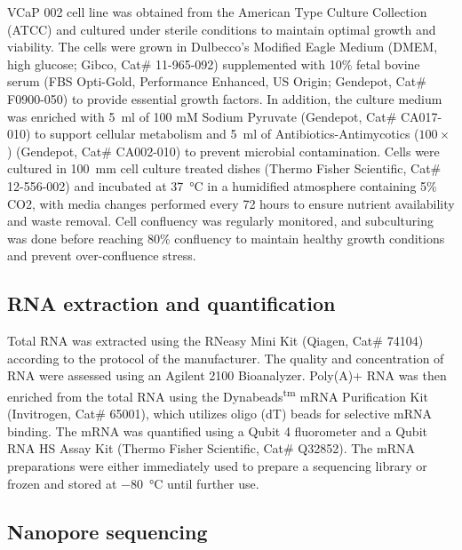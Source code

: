 \documentclass[pdflatex, sn-mathphys-num, lineno]{sn-jnl}%
\theoremstyle{thmstyleone}%
\theoremstyle{thmstyletwo}%
\theoremstyle{thmstylethree}%
\begin{document}
VCaP 002 cell line was obtained from the American Type Culture Collection (ATCC) and cultured under sterile conditions to maintain optimal growth and viability.
The cells were grown in Dulbecco's Modified Eagle Medium (DMEM, high glucose; Gibco, Cat\# 11-965-092) supplemented with 10\% fetal bovine serum (FBS Opti-Gold, Performance Enhanced, US Origin; Gendepot, Cat\# F0900-050) to provide essential growth factors.
In addition, the culture medium was enriched with \SI{5}{\ml} of 100 mM Sodium Pyruvate (Gendepot, Cat\# CA017-010) to support cellular metabolism and \SI{5}{\ml} of Antibiotics-Antimycotics (\( 100\times \)) (Gendepot, Cat\# CA002-010) to prevent microbial contamination.
Cells were cultured in \SI{100}{\mm} cell culture treated dishes (Thermo Fisher Scientific, Cat\# 12-556-002) and incubated at \SI{37}{\degreeCelsius} in a humidified atmosphere containing 5\% CO2, with media changes performed every 72 hours to ensure nutrient availability and waste removal.
Cell confluency was regularly monitored, and subculturing was done before reaching 80\% confluency to maintain healthy growth conditions and prevent over-confluence stress.

\subsection{RNA extraction and quantification}

Total RNA was extracted using the RNeasy Mini Kit (Qiagen, Cat\# 74104) according to the protocol of the manufacturer.
The quality and concentration of RNA were assessed using an Agilent 2100 Bioanalyzer.
Poly(A)+ RNA was then enriched from the total RNA using the Dynabeads\textsuperscript{tm} mRNA Purification Kit (Invitrogen, Cat\# 65001), which utilizes oligo (dT) beads for selective mRNA binding.
The mRNA was quantified using a Qubit 4 fluorometer and a Qubit RNA HS Assay Kit (Thermo Fisher Scientific, Cat\# Q32852).
The mRNA preparations were either immediately used to prepare a sequencing library or frozen and stored at \SI{-80}{\degreeCelsius} until further use.

\subsection{Nanopore sequencing}
\end{document}
